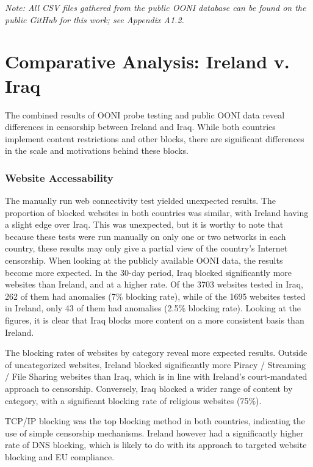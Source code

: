 \textit{Note: All CSV files gathered from the public OONI database can be found on the public GitHub for this work; see Appendix A1.2.}


\section{Comparative Analysis: Ireland v. Iraq}

The combined results of OONI probe testing and public OONI data reveal differences in censorship between Ireland and Iraq. While both countries implement content restrictions and other blocks, there are significant differences in the scale and motivations behind these blocks.

\subsubsection{Website Accessability}

The manually run web connectivity test yielded unexpected results. The proportion of blocked websites in both countries was similar, with Ireland having a slight edge over Iraq. This was unexpected, but it is worthy to note that because these tests were run manually on only one or two networks in each country, these results may only give a partial view of the country's Internet censorship. When looking at the publicly available OONI data, the results become more expected. In the 30-day period, Iraq blocked significantly more websites than Ireland, and at a higher rate. Of the 3703 websites tested in Iraq, 262 of them had anomalies (7\% blocking rate), while of the 1695 websites tested in Ireland, only 43 of them had anomalies (2.5\% blocking rate). Looking at the figures, it is clear that Iraq blocks more content on a more consistent basis than Ireland. 

The blocking rates of websites by category reveal more expected results. Outside of uncategorized websites, Ireland blocked significantly more Piracy / Streaming / File Sharing websites than Iraq, which is in line with Ireland's court-mandated approach to censorship. Conversely, Iraq blocked a wider range of content by category, with a significant blocking rate of religious websites (75\%).

TCP/IP blocking was the top blocking method in both countries, indicating the use of simple censorship mechanisms. Ireland however had a significantly higher rate of DNS blocking, which is likely to do with its approach to targeted website blocking and EU compliance.

